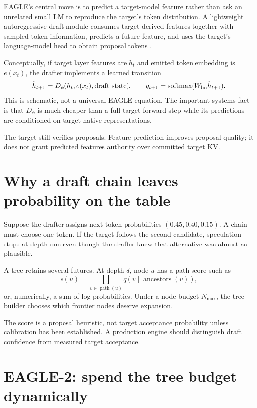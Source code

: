 EAGLE's central move is to predict a target-model feature rather than ask an unrelated
small LM to reproduce the target's token distribution. A lightweight autoregressive
draft module consumes target-derived features together with sampled-token information,
predicts a future feature, and uses the target's language-model head to obtain proposal
tokens \cite{li2024eagle}.

Conceptually, if target layer features are $h_t$ and emitted token embedding is
$e(x_t)$, the drafter implements a learned transition
\[
\widehat h_{t+1}=D_\phi(h_t,e(x_t),\text{draft state}),
\qquad
q_{t+1}=\operatorname{softmax}(W_{\rm lm}\widehat h_{t+1}).
\]
This is schematic, not a universal EAGLE equation. The important systems fact is that
$D_\phi$ is much cheaper than a full target forward step while its predictions are
conditioned on target-native representations.

The target still verifies proposals. Feature prediction improves proposal quality; it
does not grant predicted features authority over committed target KV.


\section{Why a draft chain leaves probability on the table}

Suppose the drafter assigns next-token probabilities $(0.45,0.40,0.15)$. A chain must
choose one token. If the target follows the second candidate, speculation stops at
depth one even though the drafter knew that alternative was almost as plausible.

A tree retains several futures. At depth $d$, node $u$ has a path score such as
\[
s(u)=\prod_{v\in\operatorname{path}(u)}q(v\mid\operatorname{ancestors}(v)),
\]
or, numerically, a sum of log probabilities. Under a node budget $N_{\max}$, the tree
builder chooses which frontier nodes deserve expansion.

The score is a proposal heuristic, not target acceptance probability unless calibration
has been established. A production engine should distinguish draft confidence from
measured target acceptance.

\section{EAGLE-2: spend the tree budget dynamically}

